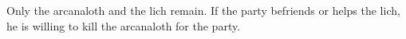 Only the arcanaloth and the lich remain.
If the party befriends or helps the lich, he is willing to kill the arcanaloth for the party.